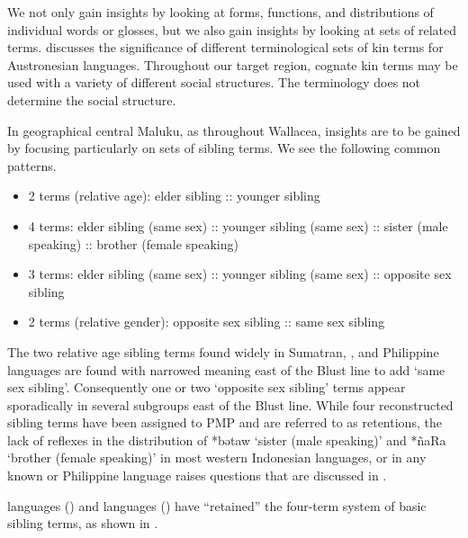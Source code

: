 We not only gain insights by looking at forms,
functions, and distributions of individual words or glosses,
but we also gain insights by looking at sets of related terms.
\citet{Fox2015} discusses the significance of different terminological
sets of kin terms for Austronesian languages.
Throughout our target region,
cognate kin terms may be used with a variety of different social structures.
The terminology does not determine the social structure.

In geographical central Maluku,
as throughout Wallacea, insights are to be gained by focusing
particularly on sets of sibling terms.
We see the following common patterns.

\begin{itemize}
	\item 2 terms (relative age): elder sibling :: younger sibling
	\item 4 terms: elder sibling (same sex) :: younger sibling (same sex) :: sister (male speaking) :: brother (female speaking)
	\item 3 terms: elder sibling (same sex) :: younger sibling (same sex) :: opposite sex sibling
	\item 2 terms (relative gender): opposite sex sibling :: same sex sibling
\end{itemize}

The two relative age sibling terms found widely in Sumatran,
, and Philippine languages are found with narrowed
meaning east of the Blust line to add ‘same sex sibling’.
Consequently one or two ‘opposite sex sibling’ terms appear sporadically
in several subgroups east of the Blust line.
While four reconstructed sibling terms have been assigned to
PMP and are referred to as retentions,
the lack of reflexes in the distribution of *bətaw ‘sister (male
speaking)’ and *ñaRa ‘brother (female speaking)’ in most western Indonesian
languages, or in any known  or Philippine language raises questions
that are discussed in .

 languages () and  languages
() have “retained” the four-term system of basic sibling
terms, as shown in .

